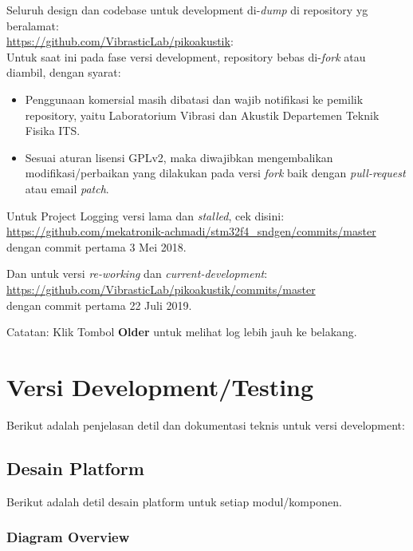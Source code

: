 \documentclass[12pt,]{article}
\begin{document}
	Seluruh design dan codebase untuk development di-\textit{dump} di repository yg beralamat:\\
	\url{https://github.com/VibrasticLab/pikoakustik}:\\
	
	Untuk saat ini pada fase versi development, repository bebas di-\textit{fork} atau diambil,
	dengan syarat:
	\begin{itemize}
		\item Penggunaan komersial masih dibatasi dan wajib notifikasi ke pemilik repository,
		yaitu Laboratorium Vibrasi dan Akustik Departemen Teknik Fisika ITS.
		
		\item Sesuai aturan lisensi GPLv2, maka diwajibkan mengembalikan modifikasi/perbaikan 
		yang dilakukan pada versi \textit{fork} baik dengan \textit{pull-request} atau email \textit{patch}.
	\end{itemize}

	Untuk Project Logging versi lama dan \textit{stalled}, cek disini:\\
	\url{https://github.com/mekatronik-achmadi/stm32f4_sndgen/commits/master}\\
	dengan commit pertama 3 Mei 2018.
	
	Dan untuk versi \textit{re-working} dan \textit{current-development}:\\
	\url{https://github.com/VibrasticLab/pikoakustik/commits/master}\\
	dengan commit pertama 22 Juli 2019.
	
	Catatan: Klik Tombol \textbf{Older} untuk melihat log lebih jauh ke belakang.
	
	\newpage
	\mbox{}
	
	\newpage
	\section{Versi Development/Testing}
	
	Berikut adalah penjelasan detil dan dokumentasi teknis untuk versi development:
	
	\subsection{Desain Platform}
	
	Berikut adalah detil desain platform untuk setiap modul/komponen.
	
	\subsubsection{Diagram Overview}
	
\end{document}
